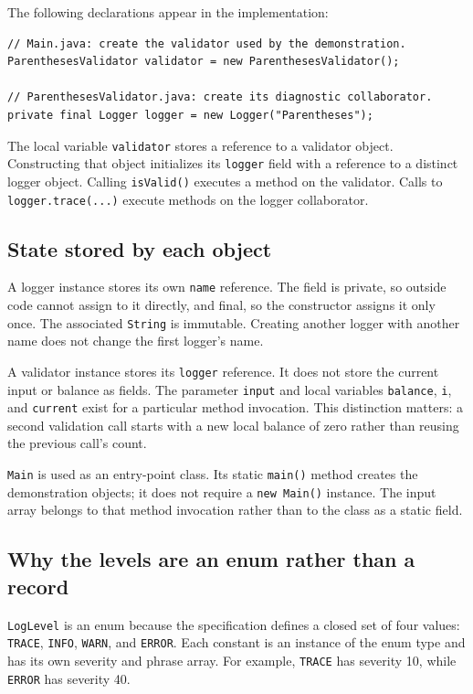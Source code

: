 \documentclass[12pt,a4paper]{article}
\newcommand{\code}[1]{\texttt{#1}}
\begin{document}
\begin{samepage}
The following declarations appear in the implementation:
\begin{lstlisting}
// Main.java: create the validator used by the demonstration.
ParenthesesValidator validator = new ParenthesesValidator();

// ParenthesesValidator.java: create its diagnostic collaborator.
private final Logger logger = new Logger("Parentheses");
\end{lstlisting}
\end{samepage}
The local variable \code{validator} stores a reference to a validator object. Constructing that object initializes its \code{logger} field with a reference to a distinct logger object. Calling \code{isValid()} executes a method on the validator. Calls to \code{logger.trace(...)} execute methods on the logger collaborator.

\subsection{State stored by each object}
A logger instance stores its own \code{name} reference. The field is private, so outside code cannot assign to it directly, and final, so the constructor assigns it only once. The associated \code{String} is immutable. Creating another logger with another name does not change the first logger's name.

A validator instance stores its \code{logger} reference. It does not store the current input or balance as fields. The parameter \code{input} and local variables \code{balance}, \code{i}, and \code{current} exist for a particular method invocation. This distinction matters: a second validation call starts with a new local balance of zero rather than reusing the previous call's count.

\code{Main} is used as an entry-point class. Its static \code{main()} method creates the demonstration objects; it does not require a \code{new Main()} instance. The input array belongs to that method invocation rather than to the class as a static field.

\subsection{Why the levels are an enum rather than a record}
\code{LogLevel} is an enum because the specification defines a closed set of four values: \code{TRACE}, \code{INFO}, \code{WARN}, and \code{ERROR}. Each constant is an instance of the enum type and has its own severity and phrase array. For example, \code{TRACE} has severity 10, while \code{ERROR} has severity 40.
\end{document}
